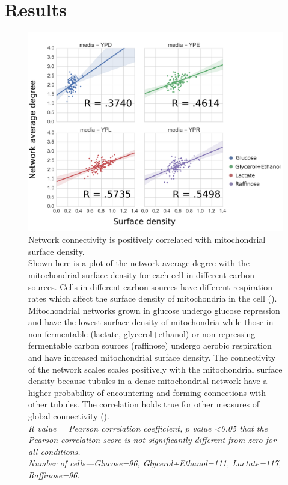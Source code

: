 \section{Results}
%
\begin{figure}[htp]
	\centering
    \hspace*{.5in}\includegraphics[width=.85\textwidth]{conndense}
    \caption[Network connectivity is positively correlated with mitochondrial surface density]{Network connectivity is positively correlated with mitochondrial surface density.\\Shown here is a plot of the network average degree with the mitochondrial surface density for each cell in different carbon sources. Cells in different carbon sources have different respiration rates which affect the surface density of mitochondria in the cell (). Mitochondrial networks grown in glucose undergo glucose repression and have the lowest surface density of mitochondria while those in non-fermentable (lactate, glycerol+ethanol) or non repressing fermentable carbon sources (raffinose) undergo aerobic respiration and have increased mitochondrial surface density. The connectivity of the network scales scales positively with the mitochondrial surface density because tubules in a dense mitochondrial network have a higher probability of encountering and forming connections with other tubules. The correlation holds true for other measures of global connectivity ().\\\emph{R value = Pearson correlation coefficient, $p$ value <0.05 that the Pearson correlation score is not significantly different from zero for all conditions.\\Number of cells---Glucose=96, Glycerol+Ethanol=111, Lactate=117, Raffinose=96.}}\label{fig:conndense}
\end{figure}
%
